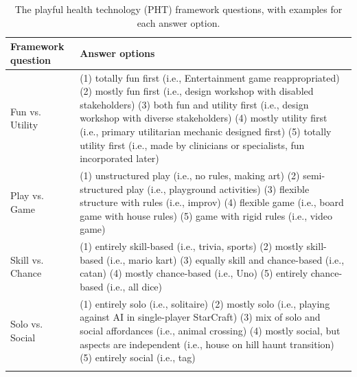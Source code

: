 \begin{table}[t]
\caption{The playful health technology (PHT) framework questions, with examples for each answer option.}
\label{tab:pht}
\small
\begin{tabular}{p{}p{}}
\toprule
Framework question & Answer options \\
\midrule
Fun vs. Utility & (1) totally fun first (i.e., Entertainment game reappropriated) \newline (2) mostly fun first (i.e., design workshop with disabled stakeholders) \newline (3) both fun and utility first (i.e., design workshop with diverse stakeholders) \newline (4) mostly utility first (i.e., primary utilitarian mechanic designed first) \newline (5) totally utility first (i.e., made by clinicians or specialists, fun incorporated later) \\ \addlinespace
Play vs. Game & (1) unstructured play (i.e., no rules, making art) \newline (2) semi-structured play (i.e., playground activities) \newline (3) flexible structure with rules (i.e., improv) \newline (4) flexible game (i.e., board game with house rules) \newline (5) game with rigid rules (i.e., video game) \\ \addlinespace
Skill vs. Chance & (1) entirely skill-based (i.e., trivia, sports) \newline (2) mostly skill-based (i.e., mario kart) \newline (3) equally skill and chance-based (i.e., catan) \newline (4) mostly chance-based (i.e., Uno) \newline (5) entirely chance-based (i.e., all dice) \\ \addlinespace
Solo vs. Social & (1) entirely solo (i.e., solitaire) \newline (2) mostly solo (i.e., playing against AI in single-player StarCraft) \newline (3) mix of solo and social affordances (i.e., animal crossing) \newline (4) mostly social, but aspects are independent (i.e., house on hill haunt transition) \newline (5) entirely social (i.e., tag) \\ \addlinespace

\end{tabular}
\end{table}

